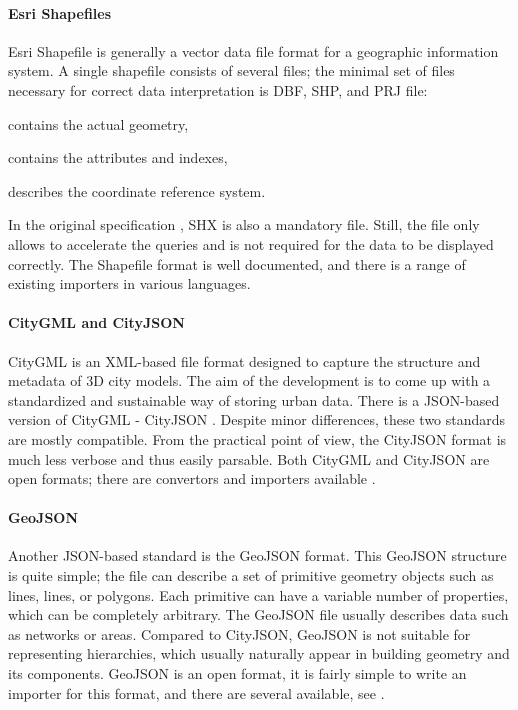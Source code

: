 \paragraph{Esri Shapefiles} 
Esri Shapefile \cite{esri1998shapefile} is generally a vector data file format for a geographic information system. A single shapefile consists of several files; the minimal set of files necessary for correct data interpretation is  DBF, SHP, and PRJ file: 

\begin{description}[noitemsep]
    \item[SHP] contains the actual geometry,
    \item[DBF] contains the attributes and indexes,
    \item[PRJ] describes the coordinate reference system.  
\end{description}
In the original specification \cite{esri1998shapefile}, SHX is also a mandatory file. Still, the file only allows to accelerate the queries and is not required for the data to be displayed correctly. The Shapefile format is well documented, and there is a range of existing importers in various languages. 


\paragraph{CityGML and CityJSON}
CityGML \cite{groger2012ogc} is an XML-based file format designed to capture the structure and metadata of 3D city models. The aim of the development is to come up with a standardized and sustainable way of storing urban data. There is a JSON-based version of CityGML - CityJSON \cite{ledoux2019cityjson}. Despite minor differences, these two standards are mostly compatible. From the practical point of view, the CityJSON format is much less verbose and thus easily parsable. Both CityGML and CityJSON are open formats; there are convertors and importers available .

\paragraph{GeoJSON}
Another JSON-based standard is the GeoJSON format. This GeoJSON structure is quite simple; the file can describe a set of primitive geometry objects such as lines, lines, or polygons. Each primitive can have a variable number of properties, which can be completely arbitrary. The GeoJSON file usually describes data such as networks or areas. Compared to CityJSON, GeoJSON is not suitable for representing hierarchies, which usually naturally appear in building geometry and its components. GeoJSON is an open format, it is fairly simple to write an importer for this format, and there are several available, see \cite{cityJSONconvert, cityGMLimport}. 

